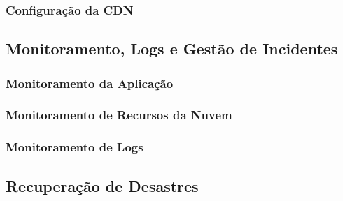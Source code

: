 \subsubsection{Configuração da CDN}

\subsection{Monitoramento, Logs e Gestão de Incidentes}

\subsubsection{Monitoramento da Aplicação}

\subsubsection{Monitoramento de Recursos da Nuvem}

\subsubsection{Monitoramento de Logs}


\subsection{Recuperação de Desastres}


